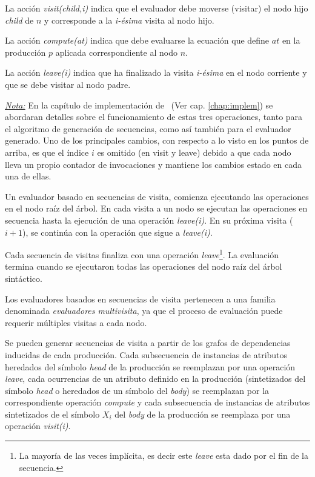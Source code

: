 \begin{description}
\item La acción \emph{visit(child,i)} indica que el evaluador debe moverse (visitar) el nodo hijo \emph{child} de $n$ y corresponde a la \emph{i-ésima} visita al nodo hijo.

\item La acción \emph{compute(at)} indica que debe evaluarse la ecuación que define 
$at$ en la producción $p$ aplicada correspondiente al nodo $n$.

\item La acción \emph{leave(i)} indica que ha finalizado la visita \emph{i-ésima} en
el nodo corriente y que se debe visitar al nodo padre.
\end{description}
\underline{\textit{Nota:}}
En la capítulo de implementación de \maggen\ (Ver cap. \ref{chap:implem}) se abordaran detalles sobre el funcionamiento de estas tres operaciones, tanto para el algoritmo de generación de secuencias, como así también para el evaluador generado. Uno de los principales cambios, con respecto a lo visto en los puntos de arriba, es que el índice $i$ es omitido (en visit y leave) debido a que cada nodo lleva un propio contador de invocaciones y mantiene los cambios estado en cada una de ellas.  

Un evaluador basado en secuencias de visita, comienza ejecutando las operaciones en el nodo raíz del árbol. En cada visita a un nodo se ejecutan las operaciones en secuencia hasta la ejecución de una operación \emph{leave(i)}.
En su próxima visita ($i+1$), se continúa con la operación que sigue a \emph{leave(i)}.

Cada secuencia de visitas finaliza con una operación \emph{leave}\footnote{La mayoría de las veces implícita, es decir este \emph{leave} esta dado por el fin de la secuencia.}. La evaluación termina cuando se ejecutaron todas las operaciones del nodo raíz del árbol
sintáctico.

Los evaluadores basados en secuencias de visita pertenecen a una familia denominada  \emph{evaluadores multivisita}, ya que el proceso de evaluación puede requerir múltiples visitas a cada nodo.

Se pueden generar secuencias de visita a partir de los grafos de dependencias inducidas de cada producción. Cada subsecuencia de instancias de atributos heredados del símbolo \textit{head} de la producción se reemplazan por una operación \emph{leave}, cada ocurrencias de un atributo definido en la producción (sintetizados del símbolo \textit{head} o heredados de un símbolo del \textit{body}) se reemplazan por la correspondiente operación \emph{compute} y cada subsecuencia de instancias de atributos sintetizados de el símbolo $X_i$ del \textit{body} de la producción se reemplaza por una  operación \emph{visit(i)}.

